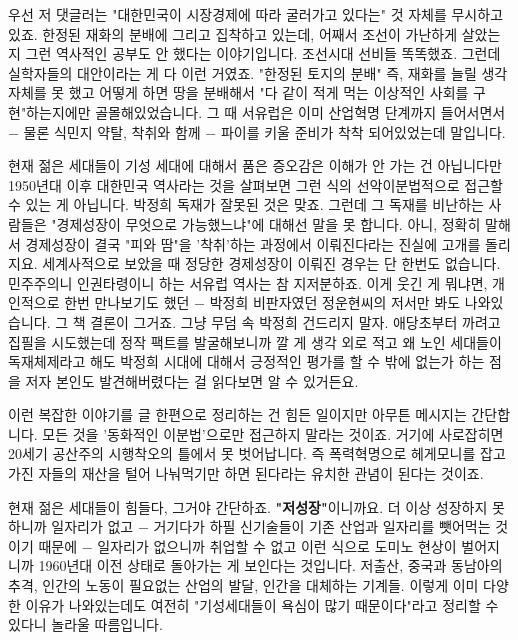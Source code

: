 우선 저 댓글러는 "대한민국이 시장경제에 따라 굴러가고 있다는" 것 자체를 무시하고 있죠.
한정된 재화의 분배에 그리고 집착하고 있는데, 어째서 조선이 가난하게 살았는지 그런 역사적인 공부도 안 했다는 이야기입니다.
조선시대 선비들 똑똑했죠. 그런데 실학자들의 대안이라는 게 다 이런 거였죠. "한정된 토지의 분배"
즉, 재화를 늘릴 생각 자체를 못 했고 어떻게 하면 땅을 분배해서 "다 같이 적게 먹는 이상적인 사회를 구현"하는지에만 골몰해있었습니다.
그 때 서유럽은 이미 산업혁명 단계까지 들어서면서 $-$ 물론 식민지 약탈, 착취와 함께 $-$ 파이를 키울 준비가 착착 되어있었는데 말입니다.
\vspace{5mm}

현재 젊은 세대들이 기성 세대에 대해서 품은 증오감은 이해가 안 가는 건 아닙니다만
1950년대 이후 대한민국 역사라는 것을 살펴보면 그런 식의 선악이분법적으로 접근할 수 있는 게 아닙니다.
박정희 독재가 잘못된 것은 맞죠. 그런데 그 독재를 비난하는 사람들은 "경제성장이 무엇으로 가능했느냐"에 대해선 말을 못 합니다.
아니, 정확히 말해서 경제성장이 결국 "피와 땀"을 '착취'하는 과정에서 이뤄진다라는 진실에 고개를 돌리지요.
세계사적으로 보았을 때 정당한 경제성장이 이뤄진 경우는 단 한번도 없습니다. 민주주의니 인권타령이니 하는 서유럽 역사는 참 지저분하죠.
이게 웃긴 게 뭐냐면, 개인적으로 한번 만나보기도 했던 $-$ 박정희 비판자였던 정운현씨의 저서만 봐도 나와있습니다.
그 책 결론이 그거죠. 그냥 무덤 속 박정희 건드리지 말자.
애당초부터 까려고 집필을 시도했는데 정작 팩트를 발굴해보니까 깔 게 생각 외로 적고 왜 노인 세대들이 독재체제라고 해도
박정희 시대에 대해서 긍정적인 평가를 할 수 밖에 없는가 하는 점을 저자 본인도 발견해버렸다는 걸 읽다보면 알 수 있거든요.
\vspace{5mm}

이런 복잡한 이야기를 글 한편으로 정리하는 건 힘든 일이지만 아무튼 메시지는 간단합니다.
모든 것을 '동화적인 이분법'으로만 접근하지 말라는 것이죠. 거기에 사로잡히면 20세기 공산주의 시행착오의 틀에서 못 벗어납니다.
즉 폭력혁명으로 헤게모니를 잡고 가진 자들의 재산을 털어 나눠먹기만 하면 된다라는 유치한 관념이 된다는 것이죠.
\vspace{5mm}

현재 젊은 세대들이 힘들다, 그거야 간단하죠. \textbf{"저성장"}이니까요.
더 이상 성장하지 못 하니까 일자리가 없고 $-$ 거기다가 하필 신기술들이 기존 산업과 일자리를 뺏어먹는 것이기 때문에 $-$
일자리가 없으니까 취업할 수 없고 이런 식으로 도미노 현상이 벌어지니까 1960년대 이전 상태로 돌아가는 게 보인다는 것입니다.
저출산, 중국과 동남아의 추격, 인간의 노동이 필요없는 산업의 발달, 인간을 대체하는 기계들.
이렇게 이미 다양한 이유가 나와있는데도 여전히 "기성세대들이 욕심이 많기 때문이다"라고 정리할 수 있다니 놀라울 따름입니다.
\vspace{5mm}

